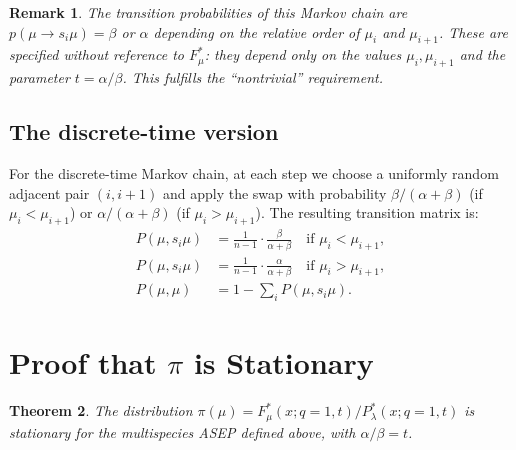 \documentclass[12pt]{article}
\newtheorem{theorem}{Theorem}
\newtheorem{remark}[theorem]{Remark}
\begin{document}
\begin{remark}
The transition probabilities of this Markov chain are $p(\mu \to s_i\mu) = \beta$ or $\alpha$ depending on the relative order of $\mu_i$ and $\mu_{i+1}$. These are specified without reference to $F^*_\mu$: they depend only on the values $\mu_i, \mu_{i+1}$ and the parameter $t = \alpha/\beta$. This fulfills the ``nontrivial'' requirement.
\end{remark}

\subsection{The discrete-time version}

For the discrete-time Markov chain, at each step we choose a uniformly random adjacent pair $(i, i+1)$ and apply the swap with probability $\beta/(\alpha + \beta)$ (if $\mu_i < \mu_{i+1}$) or $\alpha/(\alpha+\beta)$ (if $\mu_i > \mu_{i+1}$). The resulting transition matrix is:
\begin{align*}
P(\mu, s_i \mu) &= \frac{1}{n-1} \cdot \frac{\beta}{\alpha + \beta} \quad \text{if } \mu_i < \mu_{i+1}, \\
P(\mu, s_i \mu) &= \frac{1}{n-1} \cdot \frac{\alpha}{\alpha + \beta} \quad \text{if } \mu_i > \mu_{i+1}, \\
P(\mu, \mu) &= 1 - \sum_i P(\mu, s_i\mu).
\end{align*}

\section{Proof that $\pi$ is Stationary}

\begin{theorem}\label{thm:stationary}
The distribution $\pi(\mu) = F^*_\mu(x; q{=}1, t) / P^*_\lambda(x; q{=}1, t)$ is stationary for the multispecies ASEP defined above, with $\alpha/\beta = t$.
\end{theorem}
\end{document}
